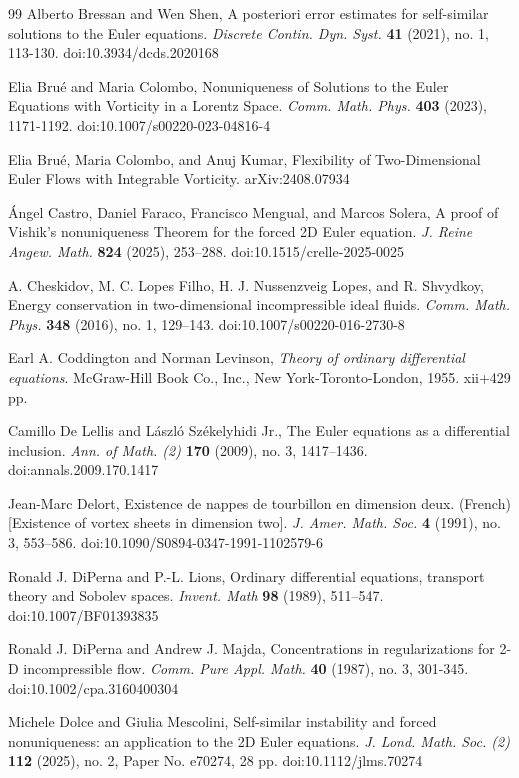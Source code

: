 \documentclass[11pt]{article}
\theoremstyle{definition}
\theoremstyle{remark}
\numberwithin{equation}{section}
\newcommand{\tbf}{\textbf}
\begin{document}
\begin{flushleft}
\begin{thebibliography}{99}
 Alberto Bressan and Wen Shen, A posteriori error estimates for self-similar solutions to the Euler equations. \textit{Discrete Contin. Dyn. Syst.} \tbf{41} (2021), no. 1, 113-130. doi:10.3934/dcds.2020168

 Elia Bru\'e and Maria Colombo, Nonuniqueness of Solutions to the Euler Equations with Vorticity in a Lorentz Space. \textit{Comm. Math. Phys.} \tbf{403} (2023), 1171-1192. doi:10.1007/s00220-023-04816-4

 Elia Bru\'e, Maria Colombo, and Anuj Kumar, Flexibility of Two-Dimensional Euler Flows with Integrable Vorticity. arXiv:2408.07934

 Ángel Castro, Daniel Faraco, Francisco Mengual, and Marcos Solera, A proof of Vishik's nonuniqueness Theorem for the forced 2D Euler equation. \textit{J. Reine Angew. Math.} \tbf{824} (2025), 253–288. doi:10.1515/crelle-2025-0025

 A. Cheskidov, M. C. Lopes Filho, H. J. Nussenzveig Lopes, and R. Shvydkoy, Energy conservation in two-dimensional incompressible ideal fluids. \textit{Comm. Math. Phys.} \tbf{348} (2016), no. 1, 129–143. doi:10.1007/s00220-016-2730-8

 Earl A. Coddington and Norman Levinson, \textit{Theory of ordinary differential equations}. McGraw-Hill Book Co., Inc., New York-Toronto-London, 1955. xii+429 pp.

 Camillo De Lellis and László Székelyhidi Jr., The Euler equations as a differential inclusion. \textit{Ann. of Math. (2)} \tbf{170} (2009), no. 3, 1417–1436. doi:annals.2009.170.1417

 Jean-Marc Delort, Existence de nappes de tourbillon en dimension deux. (French) [Existence of vortex sheets in dimension two]. \textit{J. Amer. Math. Soc.} \tbf{4} (1991), no. 3, 553–586. doi:10.1090/S0894-0347-1991-1102579-6

 Ronald J. DiPerna and P.-L. Lions, Ordinary differential equations, transport theory and Sobolev spaces. \textit{Invent. Math} \tbf{98} (1989), 511–547. doi:10.1007/BF01393835

 Ronald J. DiPerna and Andrew J. Majda, Concentrations in regularizations for 2-D incompressible flow. \textit{Comm. Pure Appl. Math.} \tbf{40} (1987), no. 3, 301-345. doi:10.1002/cpa.3160400304

 Michele Dolce and Giulia Mescolini, Self-similar instability and forced nonuniqueness: an application to the 2D Euler equations. \textit{J. Lond. Math. Soc. (2)} \tbf{112} (2025), no. 2, Paper No. e70274, 28 pp. doi:10.1112/jlms.70274


\end{thebibliography}
\end{flushleft}
\end{document}
